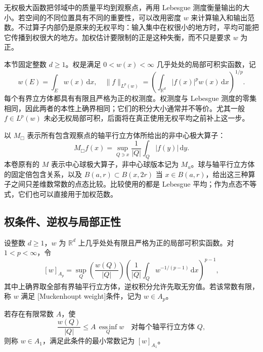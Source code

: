无权极大函数把邻域中的质量平均到观察点，再用 Lebesgue 测度衡量输出的大小。若空间的不同位置具有不同的重要性，可以改用密度 \(w\) 来计算输入和输出范数。不过算子内部仍是原来的无权平均：输入集中在权很小的地方时，平均可能把它传播到权很大的地方。加权估计要限制的正是这种失衡，而不只是要求 \(w\) 为正。

\ProseParagraphBreak

本节固定整数 \(d\geq1\)。权是满足 \(0<w(x)<\infty\) 几乎处处的局部可积实函数，记
\[
 w(E)=\int_Ew(x)\,\mathrm dx,\quad
 \|f\|_{L^p(w)}
       =\left(\int_{\mathbb R^d}|f(x)|^pw(x)\,\mathrm dx\right)^{1/p}.
\]
每个有界立方体都具有有限且严格为正的权测度。权测度与 Lebesgue 测度的零集相同，因此两者的本性上确界相同；它们的积分大小通常并不等价。尤其一般 \(f\in L^p(w)\) 未必无权局部可积，后面将在真正使用无权平均之前补上这一步。

\ProseParagraphBreak

以 \(M_\mdlgwhtsquare\) 表示所有包含观察点的轴平行立方体所给出的非中心极大算子：
\[
 M_\mdlgwhtsquare f(x)=\sup_{Q\ni x}\frac1{|Q|}\int_Q|f(y)|\,\mathrm dy.
\]
本卷原有的 \(M\) 表示中心球极大算子，非中心球版本记为 \(M_u\)。球与轴平行立方体的固定倍包含关系，以及
\(B(a,r)\subset B(x,2r)\) 当 \(x\in B(a,r)\)，给出这三种算子之间只差维数常数的点态比较。比较使用的都是 Lebesgue 平均；作为点态不等式，它们也可以直接用于加权范数。

\subsection{权条件、逆权与局部正性}
\label{b2:subsec:C-weight-conditions}

\begin{definition}[\(A_p\) 与 \(A_1\) 权]
\label{b2:def:C-ap-weight}
设整数 \(d\geq1\)，\(w\) 为 \(\mathbb R^d\) 上几乎处处有限且严格为正的局部可积实函数。对 \(1<p<\infty\)，令
\[
 [w]_{A_p}
 =\sup_Q
       \left(\frac{w(Q)}{|Q|}\right)
       \left(\frac1{|Q|}\int_Qw^{-1/(p-1)}\,\mathrm dx\right)^{p-1},
\]
其中上确界取全部有界轴平行立方体，逆权积分允许先取无穷值。若该常数有限，称 \(w\) 满足
[Muckenhoupt weight]条件，记为 \(w\in A_p\)。

\ProseParagraphBreak

若存在有限常数 \(A\)，使
\[
 \frac{w(Q)}{|Q|}
       \leq A\,\operatorname*{ess\,inf}_Qw
       \quad\text{对每个轴平行立方体 }Q,
\]
则称 \(w\in A_1\)，满足此条件的最小常数记为 \([w]_{A_1}\)。
\end{definition}

